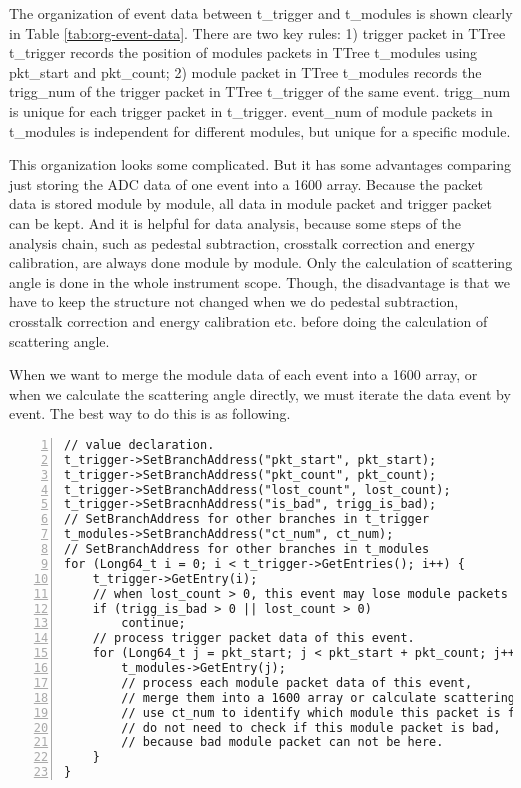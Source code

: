 \documentclass[a4paper, 12pt, onecolumn]{article}
\begin{document}
The organization of event data between t\_trigger and t\_modules is shown clearly in Table \ref{tab:org-event-data}.
There are two key rules:
1) trigger packet in TTree t\_trigger records the position of modules packets in TTree t\_modules using pkt\_start and pkt\_count;
2) module packet in TTree t\_modules records the trigg\_num of the trigger packet in TTree t\_trigger of the same event.
trigg\_num is unique for each trigger packet in t\_trigger.
event\_num of module packets in t\_modules is independent for different modules, but unique for a specific module.

This organization looks some complicated. But it has some advantages comparing just storing the ADC data of one event into a 1600 array.
Because the packet data is stored module by module, all data in module packet and trigger packet can be kept.
And it is helpful for data analysis, because some steps of the analysis chain, such as pedestal subtraction, crosstalk correction and energy calibration,
are always done module by module. Only the calculation of scattering angle is done in the whole instrument scope.
Though, the disadvantage is that we have to keep the structure not changed when we do pedestal subtraction, crosstalk correction and energy calibration etc. before
doing the calculation of scattering angle.

When we want to merge the module data of each event into a 1600 array, or when we calculate the scattering angle directly, we must iterate the data event by event.
The best way to do this is as following.

\begin{Verbatim}[fontsize=\scriptsize, frame=lines, numbers=left]
// value declaration. 
t_trigger->SetBranchAddress("pkt_start", pkt_start);
t_trigger->SetBranchAddress("pkt_count", pkt_count);
t_trigger->SetBranchAddress("lost_count", lost_count);
t_trigger->SetBracnhAddress("is_bad", trigg_is_bad);
// SetBranchAddress for other branches in t_trigger
t_modules->SetBranchAddress("ct_num", ct_num);
// SetBranchAddress for other branches in t_modules
for (Long64_t i = 0; i < t_trigger->GetEntries(); i++) {
    t_trigger->GetEntry(i);
    // when lost_count > 0, this event may lose module packets
    if (trigg_is_bad > 0 || lost_count > 0)
        continue;
    // process trigger packet data of this event.
    for (Long64_t j = pkt_start; j < pkt_start + pkt_count; j++) {
        t_modules->GetEntry(j);
        // process each module packet data of this event, 
        // merge them into a 1600 array or calculate scattering angle directly.
        // use ct_num to identify which module this packet is from.
        // do not need to check if this module packet is bad, 
        // because bad module packet can not be here.
    }
}  
\end{Verbatim}
\end{document}
